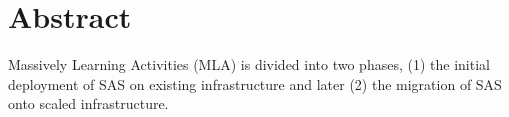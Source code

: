 \section{Abstract}
\textcolor{red}{\lipsum[1-4]}

Massively Learning Activities (MLA) is divided into two phases, (1) the initial deployment of SAS on existing infrastructure and later (2) the migration of SAS onto scaled infrastructure.